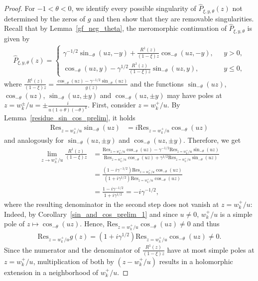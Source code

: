 \documentclass[10pt,a4paper]{amsart}
\newcommand{\1}{\mathds{1}}
\begin{document}
\begin{proof}
For $-1<\theta<0$, we identify every possible singularity of $\hat{P}_{\xi,y,\theta}(z)$ not determined by the zeros of $g$ and then show that they are removable singularities. Recall that by Lemma~\ref{gf_neg_theta}, the meromorphic continuation of $\hat{P}_{\xi,y,\theta}$ is given by
\begin{align*}
      \hat{P}_{\xi,y,\theta}(z)=  
      \begin{cases}
          \gamma^{-1/2}\sin_{-\theta}(uz,-y)+\frac{R^1(z)}{(1-\xi) z}\cos_{-\theta}(uz,-y),~~~&y>0,
          \\\cos_{-\theta}(uz,y)
     -\gamma^{1/2}\frac{R^1(z)}{(1-\xi) z}\sin_{-\theta}(uz,y),&y\le 0,
      \end{cases}
    \end{align*}
    where $\frac{R^1(z)}{(1-\xi) z}=\frac{\cos_{-\theta}(uz)-\gamma^{-1/2}\sin_{-\theta}(uz)}{g(z)}$
and the functions $\sin_{-\theta}(uz)$, $\cos_{-\theta}(uz)$, $\sin_{-\theta}(uz,\pm y)$ and $\cos_{-\theta}(uz,\pm y)$ may have poles at $z=w_k^\pm/u=\pm\frac{i}{u(1+\theta)(-\theta)^k}$. First, consider $z=w_k^+/u$. By Lemma~\ref{residue_sin_cos_prelim}, it holds
\begin{align*}
    \mathrm{Res}_{z=w_k^+/u}\sin_{-\theta}(uz)&= i\mathrm{Res}_{z=w_k^+/u}\cos_{-\theta}(uz)
\end{align*}
and analogously for $\sin_{-\theta}(uz,\pm y)$ and $\cos_{-\theta}(uz,\pm y)$. Therefore, we get
\begin{align*}
    \lim_{z\to w_k^+/u}\frac{R^1(z)}{(1-\xi) z}
    &=\frac{\mathrm{Res}_{z=w_k^+/u}\cos_{-\theta}(uz)-\gamma^{-1/2}\mathrm{Res}_{z=w_k^+/u}\sin_{-\theta}(uz)}{\mathrm{Res}_{z=w_k^+/u}\cos_{-\theta}(uz)+\gamma^{1/2}\mathrm{Res}_{z=w_k^+/u}\sin_{-\theta}(uz)}
    \\&=\frac{(1-i\gamma^{-1/2})\mathrm{Res}_{z=w_k^+/u}\cos_{-\theta}(uz)}{(1+i\gamma^{1/2})\mathrm{Res}_{z=w_k^+/u}\cos_{-\theta}(uz)}
    \\&=\frac{1-i\gamma^{-1/2}}{1+i\gamma^{1/2}}=-i\gamma^{-1/2},
\end{align*}
where the resulting denominator in the second step does not vanish at $z= w_k^+/u$: Indeed, by Corollary~\ref{sin_and_cos_prelim_1} and since $u\neq0$,
$w_k^+/u$ is a simple pole of
$z\mapsto\cos_{-\theta}(uz)$. Hence, $\mathrm{Res}_{z=w_k^+/u}\cos_{-\theta}(uz)\neq0$ and thus
\begin{align*}
     \mathrm{Res}_{z=w_k^+/u}g(z)=(1+i\gamma^{1/2} )\mathrm{Res}_{z=w_k^+/u}\cos_{-\theta}(uz)\ne 0.
\end{align*}
Since the numerator and the denominator of $\frac{R^1(z)}{(1-\xi) z}$ have at most simple poles at $z= w_k^+/u$, multiplication of both by $(z- w_k^+/u)$ results in a holomorphic extension in a neighborhood of $w_k^+/u$. 

\end{proof}
\end{document}
